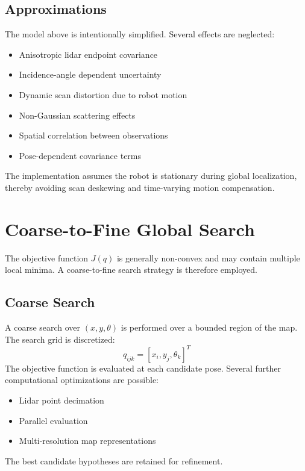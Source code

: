\documentclass[11pt]{article}
\begin{document}
\subsection{Approximations}

The model above is intentionally simplified. Several effects are neglected:
\begin{itemize}
    \item Anisotropic lidar endpoint covariance
    \item Incidence-angle dependent uncertainty
    \item Dynamic scan distortion due to robot motion
    \item Non-Gaussian scattering effects
    \item Spatial correlation between observations
    \item Pose-dependent covariance terms
\end{itemize}
The implementation assumes the robot is stationary during global localization, thereby avoiding scan deskewing and time-varying motion compensation.

\section{Coarse-to-Fine Global Search}

The objective function $J(q)$ is generally non-convex and may contain multiple local minima. A coarse-to-fine search strategy is therefore employed.

\subsection{Coarse Search}

A coarse search over $(x,y,\theta)$ is performed over a bounded region of the map. The search grid is discretized:
\begin{equation}
q_{ijk} = [x_i, y_j, \theta_k]^T
\end{equation}
The objective function is evaluated at each candidate pose. Several further computational optimizations are possible:
\begin{itemize}
    \item Lidar point decimation
    \item Parallel evaluation
    \item Multi-resolution map representations
\end{itemize}
The best candidate hypotheses are retained for refinement.
\end{document}
